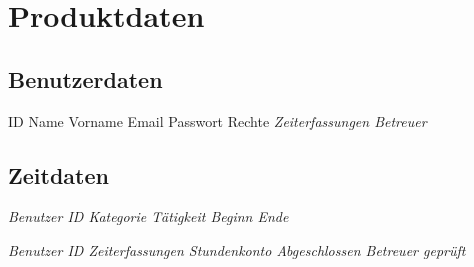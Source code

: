 \section{Produktdaten}

\subsection{Benutzerdaten}
\begin{requirements}
	\begin{requirements}
		 ID
		 Name
		 Vorname
		 Email
		 Passwort
		 Rechte
		 \em{Zeiterfassungen}
		 \em{Betreuer}
	\end{requirements}
\end{requirements}

\subsection{Zeitdaten}
\begin{requirements}
	\req [Zeiterfassung] {D20}
	\begin{requirements}
		 \em{Benutzer} ID
		 \em{Kategorie}
		 \em{Tätigkeit}
		 Beginn
		 Ende
	\end{requirements}

	\req [Stundenzettel] {D30}
	\begin{requirements}
		 \em{Benutzer} ID
		 \em{Zeiterfassungen}
		 Stundenkonto
		 Abgeschlossen
		 \em{Betreuer} geprüft
	\end{requirements}
\end{requirements}


